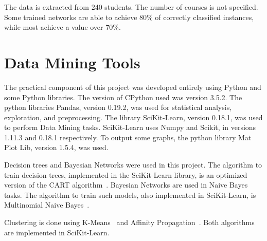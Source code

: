 The data is extracted from 240 students. The number of courses is not
specified. Some trained networks are able to achieve 80\% of correctly
classified instances, while most achieve a value over 70\%.

\section{Data Mining Tools}

The practical component of this project was developed entirely using Python and
some Python libraries. The version of CPython used was version 3.5.2. The
python libraries Pandas, version 0.19.2, was used for statistical analysis,
exploration, and preprocessing. The library SciKit-Learn, version 0.18.1, was
used to perform Data Mining tasks. SciKit-Learn uses Numpy and Scikit, in
versions 1.11.3 and 0.18.1 respectively. To output some graphs, the python
library Mat Plot Lib, version 1.5.4, was used.

Decision trees and Bayesian Networks were used in this project. The algorithm
to train decision trees, implemented in the SciKit-Learn library, is an
optimized version of the CART algorithm~\cite{web_scikit_trees}. Bayesian
Networks are used in Naive Bayes tasks. The algorithm to train such models,
also implemented in SciKit-Learn, is Multinomial Naive
Bayes~\cite{web_scikit_bayes}.

Clustering is done using K-Means~\cite{web_scikit_kmeans} and Affinity
Propagation~\cite{web_scikit_affinity}. Both algorithms are implemented in
SciKit-Learn.
